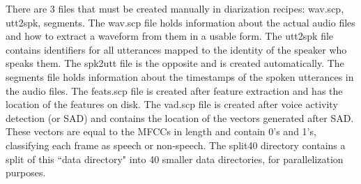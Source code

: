 	There are 3 files that must be created manually in diarization recipes: wav.scp, utt2spk, segments. The wav.scp file holds information about the actual audio files and how to extract a waveform from them in a usable form. The utt2spk file contains identifiers for all utterances mapped to the identity of the speaker who speaks them. The spk2utt file is the opposite and is created automatically. The segments file holds information about the timestamps of the spoken utterances in the audio files. The feats.scp file is created after feature extraction and has the location of the features on disk. The vad.scp file is created after voice activity detection (or SAD) and contains the location of the vectors generated after SAD. These vectors are equal to the MFCCs in length and contain 0's and 1's, classifying each frame as speech or non-speech. The split40 directory contains a split of this ``data directory" into 40 smaller data directories, for parallelization purposes.
